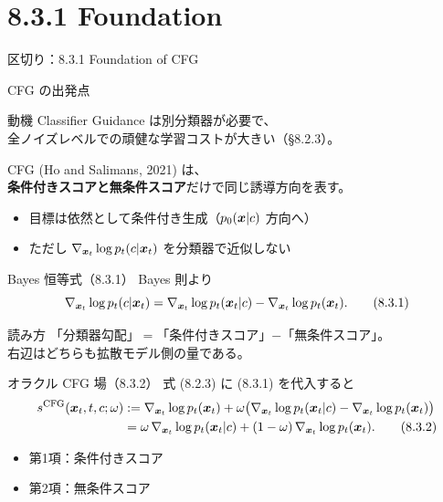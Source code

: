 \section{8.3.1 Foundation}
\asmain
\begin{frame}{区切り：8.3.1 Foundation of CFG}
    \tableofcontents[currentsection]
\end{frame}
\asmain
\begin{frame}{CFG の出発点}
    \begin{block}{動機}
        Classifier Guidance は別分類器が必要で、\\
        全ノイズレベルでの頑健な学習コストが大きい（§8.2.3）。
    \end{block}
    CFG (Ho and Salimans, 2021) は、\\
    \textbf{条件付きスコアと無条件スコア}だけで同じ誘導方向を表す。
    \begin{itemize}
        \item 目標は依然として条件付き生成（$p_0(\bm{x}|c)$ 方向へ）
        \item ただし $\nabla_{\bm{x}_t}\log p_t(c|\bm{x}_t)$ を分類器で近似しない
    \end{itemize}
\end{frame}
\asmain
\begin{frame}{Bayes 恒等式（8.3.1）}
    Bayes 則より
    \[
        \nabla_{\bm{x}_t}\log p_t(c|\bm{x}_t)
        =
        \nabla_{\bm{x}_t}\log p_t(\bm{x}_t|c)
        -
        \nabla_{\bm{x}_t}\log p_t(\bm{x}_t).
        \tag{8.3.1}
    \]
    \begin{exampleblock}{読み方}
        「分類器勾配」$=$「条件付きスコア」$-$「無条件スコア」。\\
        右辺はどちらも拡散モデル側の量である。
    \end{exampleblock}
\end{frame}
\asmain
\begin{frame}{オラクル CFG 場（8.3.2）}
    式 (8.2.3) に (8.3.1) を代入すると
    \begin{align*}
        s^{\mathrm{CFG}}(\bm{x}_t,t,c;\omega)
        &:=
        \nabla_{\bm{x}_t}\log p_t(\bm{x}_t)
        +\omega\bigl(
            \nabla_{\bm{x}_t}\log p_t(\bm{x}_t|c)
            -
            \nabla_{\bm{x}_t}\log p_t(\bm{x}_t)
        \bigr) \\
        &=
        \omega\,\nabla_{\bm{x}_t}\log p_t(\bm{x}_t|c)
        +(1-\omega)\,\nabla_{\bm{x}_t}\log p_t(\bm{x}_t).
        \tag{8.3.2}
    \end{align*}
    \begin{itemize}
        \item 第1項：条件付きスコア
        \item 第2項：無条件スコア
    \end{itemize}
\end{frame}
